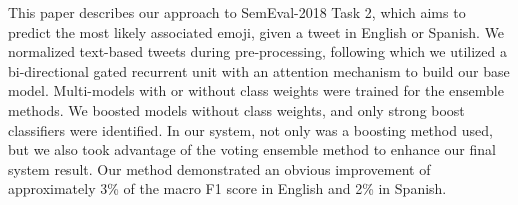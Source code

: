 This paper describes our approach to SemEval-2018 Task 2, which aims to predict the most likely associated emoji, given a tweet in English or Spanish. We normalized text-based tweets during pre-processing, following which we utilized a bi-directional gated recurrent unit with an attention mechanism to build our base model. Multi-models with or without class weights were trained for the ensemble methods. We boosted models without class weights, and only strong boost classifiers were identified. In our system, not only was a boosting method used, but we also took advantage of the voting ensemble method to enhance our final system result. Our method demonstrated an obvious improvement of approximately 3\% of the macro F1 score in English and 2\% in Spanish.
